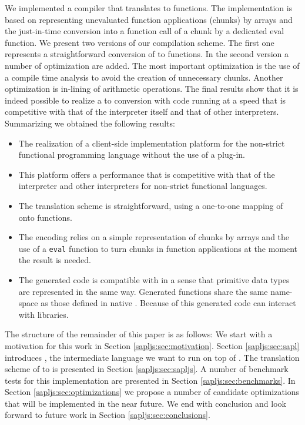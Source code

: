 We implemented a compiler that translates \Sapl to \JS functions. 
The implementation is based on representing unevaluated function applications (chunks) by \JS arrays 
and the just-in-time conversion 
into a \JS function call of a chunk by a dedicated \textsf{eval} function.
We present two versions of our compilation scheme. 
The first one represents a straightforward conversion of \Sapl to \JS functions.
In the second version a number of optimization are added.
The most important optimization is the use of a compile time analysis to avoid the creation 
of unnecessary chunks. 
Another optimization is in-lining of arithmetic operations.
The final results show that it is indeed possible to realize a \Sapl to \JS conversion with code running at a speed that is competitive with that
of the \Sapl interpreter itself and that of other interpreters.
Summarizing we obtained the following results:
\begin{itemize}
\item The realization of a client-side implementation platform for the non-strict functional programming
language \Clean without the use of a plug-in.
\item This platform offers a performance that is competitive with that of the \Sapl interpreter
and other interpreters for non-strict functional languages.
\item The translation scheme is straightforward, using a one-to-one mapping of \Sapl onto \JS
functions.
\item The encoding relies on a simple representation of chunks by \JS arrays and the use of a \texttt{eval} function to turn chunks in function applications at the moment the result is needed.
\item The generated code is compatible with \JS in a sense that primitive data types 
are represented in the same way. 
Generated functions share the same name-space as those defined in native \JS.
Because of this generated code can interact with  \JS libraries.
\end{itemize}
The structure of the remainder of this paper is as follows:
We start with a motivation for this work in Section \ref{sapljs:sec:motivation}.
Section \ref{sapljs:sec:sapl} introduces \Sapl, the intermediate language we want to run on top of \JS.
The translation scheme of \Sapl to \JS is presented in Section \ref{sapljs:sec:sapljs}.
A number of benchmark tests for this implementation are presented in Section \ref{sapljs:sec:benchmarks}.
In Section \ref{sapljs:sec:optimizations} we propose a number of candidate optimizations that will be implemented in the near future.
We end with conclusion and look forward to future work in Section \ref{sapljs:sec:conclusions}.

